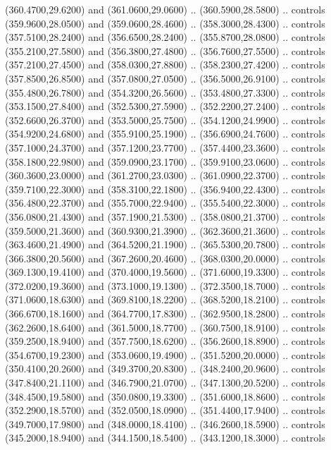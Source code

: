 {\begin{scope}[y=0.80pt, x=0.80pt, yscale=-1, xscale=1, inner sep=0pt, outer sep=0pt, #1]
      (360.4700,29.6200) and (361.0600,29.0600) .. (360.5900,28.5800) .. controls
      (359.9600,28.0500) and (359.0600,28.4600) .. (358.3000,28.4300) .. controls
      (357.5100,28.2400) and (356.6500,28.2400) .. (355.8700,28.0800) .. controls
      (355.2100,27.5800) and (356.3800,27.4800) .. (356.7600,27.5500) .. controls
      (357.2100,27.4500) and (358.0300,27.8800) .. (358.2300,27.4200) .. controls
      (357.8500,26.8500) and (357.0800,27.0500) .. (356.5000,26.9100) .. controls
      (355.4800,26.7800) and (354.3200,26.5600) .. (353.4800,27.3300) .. controls
      (353.1500,27.8400) and (352.5300,27.5900) .. (352.2200,27.2400) .. controls
      (352.6600,26.3700) and (353.5000,25.7500) .. (354.1200,24.9900) .. controls
      (354.9200,24.6800) and (355.9100,25.1900) .. (356.6900,24.7600) .. controls
      (357.1000,24.3700) and (357.1200,23.7700) .. (357.4400,23.3600) .. controls
      (358.1800,22.9800) and (359.0900,23.1700) .. (359.9100,23.0600) .. controls
      (360.3600,23.0000) and (361.2700,23.0300) .. (361.0900,22.3700) .. controls
      (359.7100,22.3000) and (358.3100,22.1800) .. (356.9400,22.4300) .. controls
      (356.4800,22.3700) and (355.7000,22.9400) .. (355.5400,22.3000) .. controls
      (356.0800,21.4300) and (357.1900,21.5300) .. (358.0800,21.3700) .. controls
      (359.5000,21.3600) and (360.9300,21.3900) .. (362.3600,21.3600) .. controls
      (363.4600,21.4900) and (364.5200,21.1900) .. (365.5300,20.7800) .. controls
      (366.3800,20.5600) and (367.2600,20.4600) .. (368.0300,20.0000) .. controls
      (369.1300,19.4100) and (370.4000,19.5600) .. (371.6000,19.3300) .. controls
      (372.0200,19.3600) and (373.1000,19.1300) .. (372.3500,18.7000) .. controls
      (371.0600,18.6300) and (369.8100,18.2200) .. (368.5200,18.2100) .. controls
      (366.6700,18.1600) and (364.7700,17.8300) .. (362.9500,18.2800) .. controls
      (362.2600,18.6400) and (361.5000,18.7700) .. (360.7500,18.9100) .. controls
      (359.2500,18.9400) and (357.7500,18.6200) .. (356.2600,18.8900) .. controls
      (354.6700,19.2300) and (353.0600,19.4900) .. (351.5200,20.0000) .. controls
      (350.4100,20.2600) and (349.3700,20.8300) .. (348.2400,20.9600) .. controls
      (347.8400,21.1100) and (346.7900,21.0700) .. (347.1300,20.5200) .. controls
      (348.4500,19.5800) and (350.0800,19.3300) .. (351.6000,18.8600) .. controls
      (352.2900,18.5700) and (352.0500,18.0900) .. (351.4400,17.9400) .. controls
      (349.7000,17.9800) and (348.0000,18.4100) .. (346.2600,18.5900) .. controls
      (345.2000,18.9400) and (344.1500,18.5400) .. (343.1200,18.3000) .. controls

\end{scope}}
